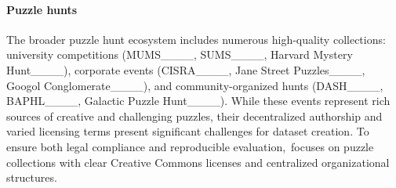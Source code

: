 \paragraph{Puzzle hunts}
The broader puzzle hunt ecosystem includes numerous high-quality collections: university competitions (MUMS____, SUMS____, Harvard Mystery Hunt____), corporate events (CISRA____, Jane Street Puzzles____, Googol Conglomerate____), and community-organized hunts (DASH____, BAPHL____, Galactic Puzzle Hunt____). 
While these events represent rich sources of creative and challenging puzzles, their decentralized authorship and varied licensing terms present significant challenges for dataset creation.
To ensure both legal compliance and reproducible evaluation,~\enigmaeval focuses on puzzle collections with clear Creative Commons licenses and centralized organizational structures.


